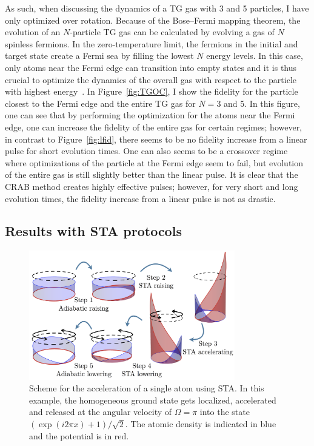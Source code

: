 As such, when discussing the dynamics of a TG gas with 3 and 5 particles, I have only optimized over rotation.
Because of the Bose--Fermi mapping theorem, the evolution of an $N$-particle TG gas can be calculated by evolving a gas of $N$ spinless fermions.
In the zero-temperature limit, the fermions in the initial and target state create a Fermi sea by filling the lowest $N$ energy levels.
In this case, only atoms near the Fermi edge can transition into empty states and it is thus crucial to optimize the dynamics of the overall gas with respect to the particle with highest energy~\cite{garaot2015}.
In Figure~\ref{fig:TGOC}, I show the fidelity for the particle closest to the Fermi edge and the entire TG gas for $N=3$ and 5.
In this figure, one can see that by performing the optimization for the atoms near the Fermi edge, one can increase the fidelity of the entire gas for certain regimes; however, in contrast to Figure~\ref{fig:lfid}, there seems to be no fidelity increase from a linear pulse for short evolution times.
One can also seems to be a crossover regime where optimizations of the particle at the Fermi edge seem to fail, but evolution of the entire gas is still slightly better than the linear pulse.
It is clear that the CRAB method creates highly effective pulses; however, for very short and long evolution times, the fidelity increase from a linear pulse is not as drastic.

\subsection{Results with STA protocols}

\begin{figure}
\centering
\includegraphics[width=0.8\textwidth]{data/1d/STAscheme.png} 
\caption{Scheme for the acceleration of a single atom using STA.
 In this example, the homogeneous ground state gets localized, accelerated and released at the angular velocity of $\Omega=\pi$ into the state
 $\left( \exp(i 2\pi x) +1 \right) /\sqrt 2$.
 The atomic density is indicated in blue and the potential is in red.}
\label{fig:STA-scheme}
\end{figure}


